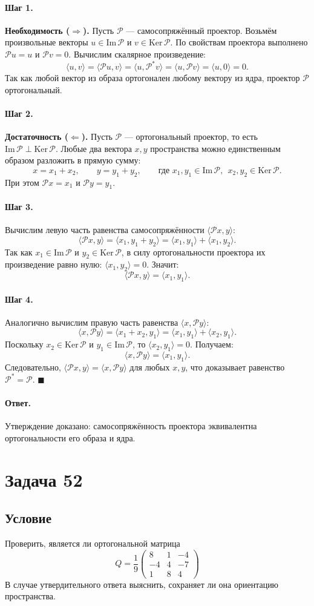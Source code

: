 \documentclass[12pt,a4paper]{article}
\theoremstyle{solution}
\newcommand{\task}[1]{\newpage\section*{Задача #1}}
\newcommand{\answer}{\paragraph{Ответ.}}
\newcommand{\step}[1]{\paragraph{Шаг #1.}}
\begin{document}
\step{1} \textbf{Необходимость ($\Rightarrow$).} Пусть $\mathcal{P}$ — самосопряжённый проектор. 
Возьмём произвольные векторы $u \in \mathrm{Im}\,\mathcal{P}$ и $v \in \mathrm{Ker}\,\mathcal{P}$. По свойствам проектора выполнено $\mathcal{P}u = u$ и $\mathcal{P}v = 0$.
Вычислим скалярное произведение:
\[
\langle u, v\rangle = \langle \mathcal{P}u, v\rangle = \langle u, \mathcal{P}^* v\rangle = \langle u, \mathcal{P}v\rangle = \langle u, 0\rangle = 0.
\]
Так как любой вектор из образа ортогонален любому вектору из ядра, проектор $\mathcal{P}$ ортогональный.

\step{2} \textbf{Достаточность ($\Leftarrow$).} Пусть $\mathcal{P}$ — ортогональный проектор, то есть $\mathrm{Im}\,\mathcal{P} \perp \mathrm{Ker}\,\mathcal{P}$.
Любые два вектора $x, y$ пространства можно единственным образом разложить в прямую сумму:
\[
x = x_1 + x_2, \qquad y = y_1 + y_2, \qquad \text{где } x_1, y_1 \in \mathrm{Im}\,\mathcal{P}, \ \ x_2, y_2 \in \mathrm{Ker}\,\mathcal{P}.
\]
При этом $\mathcal{P}x = x_1$ и $\mathcal{P}y = y_1$.

\step{3} Вычислим левую часть равенства самосопряжённости $\langle \mathcal{P}x, y\rangle$:
\[
\langle \mathcal{P}x, y\rangle = \langle x_1, y_1 + y_2\rangle = \langle x_1, y_1\rangle + \langle x_1, y_2\rangle.
\]
Так как $x_1 \in \mathrm{Im}\,\mathcal{P}$ и $y_2 \in \mathrm{Ker}\,\mathcal{P}$, в силу ортогональности проектора их произведение равно нулю: $\langle x_1, y_2\rangle = 0$. Значит:
\[
\langle \mathcal{P}x, y\rangle = \langle x_1, y_1\rangle.
\]

\step{4} Аналогично вычислим правую часть равенства $\langle x, \mathcal{P}y\rangle$:
\[
\langle x, \mathcal{P}y\rangle = \langle x_1 + x_2, y_1\rangle = \langle x_1, y_1\rangle + \langle x_2, y_1\rangle.
\]
Поскольку $x_2 \in \mathrm{Ker}\,\mathcal{P}$ и $y_1 \in \mathrm{Im}\,\mathcal{P}$, то $\langle x_2, y_1\rangle = 0$. Получаем:
\[
\langle x, \mathcal{P}y\rangle = \langle x_1, y_1\rangle.
\]
Следовательно, $\langle \mathcal{P}x, y\rangle = \langle x, \mathcal{P}y\rangle$ для любых $x, y$, что доказывает равенство $\mathcal{P}^* = \mathcal{P}$. \quad$\blacksquare$

\answer
Утверждение доказано: самосопряжённость проектора эквивалентна ортогональности его образа и ядра.

\task{52}
\subsection*{Условие}
Проверить, является ли ортогональной матрица
\[
Q = \frac{1}{9} \begin{pmatrix} 8 & 1 & -4 \\ -4 & 4 & -7 \\ 1 & 8 & 4 \end{pmatrix}
\]
В случае утвердительного ответа выяснить, сохраняет ли она ориентацию пространства.
\end{document}
